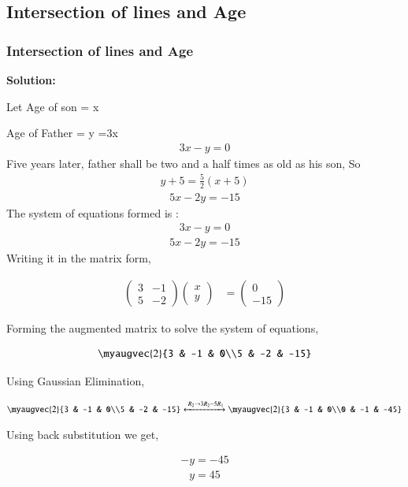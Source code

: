 \documentclass{beamer}
\theoremstyle{remark}
\newcommand{\myvec}[1]{\ensuremath{\begin{pmatrix}#1\end{pmatrix}}}
\numberwithin{equation}{section}
\begin{document}
\subsection{ Intersection of lines and Age}
\begin{frame}
\frametitle{Intersection of lines and Age}
\textbf{Solution:}

 Let Age of son = x
 
Age of Father = y =3x
\begin{align}
3x-y=0
\end{align}
Five years later, father shall be two and a half times as old as his son, So
\begin{align}
y+5 = \frac{5}{2}(x+5)
\end{align}
\begin{align}
5x-2y = -15
\end{align}
The system of equations formed is :
\begin{align}
3x-y = 0
\end{align}
\begin{align}
5x-2y = -15
\end{align}
Writing it in the matrix form,
\end{frame}
\begin{frame}
\begin{align}
  \myvec{3 & -1\\5 & -2}\myvec{x\\y} &= \myvec{0\\-15}
\end{align}

Forming the augmented matrix to solve the system of equations,

\begin{align}
  \myaugvec{2}{3 & -1 & 0\\5 & -2 & -15}
\end{align}

Using Gaussian Elimination,

\begin{align}
 \myaugvec{2}{3 & -1 & 0\\5 & -2 & -15} 
 \xleftrightarrow{\;R_2 \to 3R_2 -5R_1}
 \myaugvec{2}{3 & -1 & 0\\0 & -1 & -45} 
\end{align}

Using back substitution we get,

\begin{align}
  -y = -45
  \end{align}
  \begin{align}
  y = 45
  \end{align}
  \end{frame}
\end{document}
